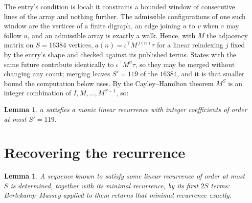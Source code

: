 \documentclass[11pt,a4paper]{article}
\theoremstyle{plain}
\newtheorem{lemma}[theorem]{Lemma}
\theoremstyle{definition}
\begin{document}
The entry's condition is local: it constrains a bounded window of consecutive lines of the
array and nothing further. The admissible configurations of one such window are the vertices
of a finite digraph, an edge joining $u$ to $v$ when $v$ may follow $u$, and an admissible
array is exactly a walk. Hence, with $M$ the adjacency matrix on $S=16384$ vertices,
$a(n)=\iota^{\!\top}M^{\,j(n)}\tau$ for a linear reindexing $j$ fixed by the entry's shape
and checked against its published terms. States with the same future contribute identically to $\iota^{\!\top}M^n\tau$, so they may be merged without changing any count; merging leaves $S'=119$ of the $16384$, and it is that smaller bound the computation below uses. By the Cayley--Hamilton theorem $M^{S}$ is an
integer combination of $I,M,\dots,M^{S-1}$, so:

\begin{lemma}\label{lem:cf}
$a$ satisfies a monic linear recurrence with integer coefficients of order at most
$S'=119$.
\end{lemma}

\section{Recovering the recurrence}

\begin{lemma}\label{lem:bm}
A sequence known to satisfy some linear recurrence of order at most $S$ is determined, together
with its minimal recurrence, by its first $2S$ terms: Berlekamp--Massey applied to them returns
that minimal recurrence exactly.
\end{lemma}
\end{document}
